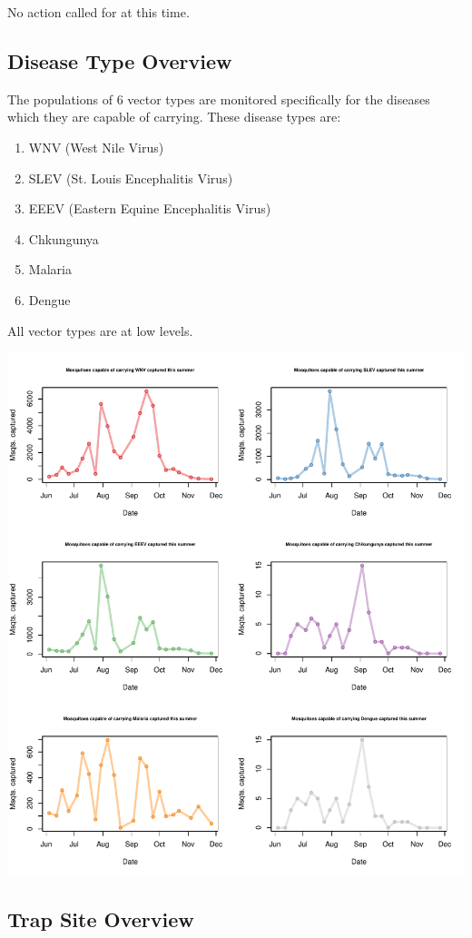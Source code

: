 \documentclass{article}
\begin{document}
No action called for at this time.
\newpage
\begin{center}
\section*{Disease Type Overview}

\end{center}
The populations of 6 vector types are monitored specifically for the diseases which they are capable of carrying.  These disease types are:\\
\begin{enumerate}
  \item WNV (West Nile Virus)
  \item SLEV (St. Louis Encephalitis Virus)
  \item EEEV (Eastern Equine Encephalitis Virus)
  \item Chkungunya
  \item Malaria
  \item Dengue\\
\end{enumerate}
All vector types are at low levels.
\begin{center}
\includegraphics{mosq08nov13-005}
\end{center}
\newpage
\begin{center}
\section*{Trap Site Overview}

\end{center}
\end{document}

